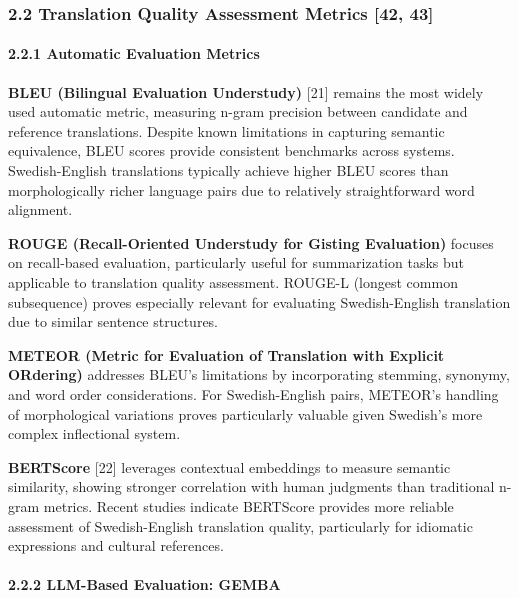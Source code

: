 \documentclass[12pt,a4paper]{article}
\begin{document}
{\hypertarget{translation-quality-assessment-metrics-42-43}{%
\subsubsection{2.2 Translation Quality Assessment Metrics {[}42,
43{]}}\label{translation-quality-assessment-metrics-42-43}}

\hypertarget{automatic-evaluation-metrics}{%
\paragraph{2.2.1 Automatic Evaluation
Metrics}\label{automatic-evaluation-metrics}}

\textbf{BLEU (Bilingual Evaluation Understudy)} {[}21{]} remains the
most widely used automatic metric, measuring n-gram precision between
candidate and reference translations. Despite known limitations in
capturing semantic equivalence, BLEU scores provide consistent
benchmarks across systems. Swedish-English translations typically
achieve higher BLEU scores than morphologically richer language pairs
due to relatively straightforward word alignment.

\textbf{ROUGE (Recall-Oriented Understudy for Gisting Evaluation)}
focuses on recall-based evaluation, particularly useful for
summarization tasks but applicable to translation quality assessment.
ROUGE-L (longest common subsequence) proves especially relevant for
evaluating Swedish-English translation due to similar sentence
structures.

\textbf{METEOR (Metric for Evaluation of Translation with Explicit
ORdering)} addresses BLEU's limitations by incorporating stemming,
synonymy, and word order considerations. For Swedish-English pairs,
METEOR's handling of morphological variations proves particularly
valuable given Swedish's more complex inflectional system.

\textbf{BERTScore} {[}22{]} leverages contextual embeddings to measure
semantic similarity, showing stronger correlation with human judgments
than traditional n-gram metrics. Recent studies indicate BERTScore
provides more reliable assessment of Swedish-English translation
quality, particularly for idiomatic expressions and cultural references.

\hypertarget{llm-based-evaluation-gemba}{%
\paragraph{2.2.2 LLM-Based Evaluation:
GEMBA}\label{llm-based-evaluation-gemba}}

}
\end{document}
